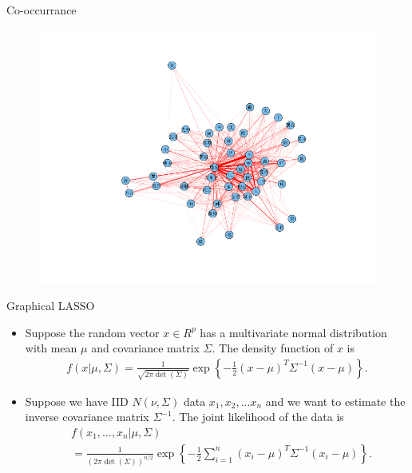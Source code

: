 \documentclass[12pt, trans]{beamer}
\newcommand{\1}[1]{{\mathbf 1}\left\{#1\right\}}        %
\def\lp{\left(}
\def\rp{\right)}
\begin{document}
\begin{frame}{Co-occurrance}

\begin{figure}
  \centering
  \includegraphics[height=0.9\textheight]{./../../coocurResults/cooccurNetwork.png} 
\end{figure}

\end{frame}

\begin{frame}[fragile]{Graphical LASSO}

\begin{itemize}[<+->]
\item Suppose the random vector $x\in R^p$ has a multivariate normal distribution with mean $\mu$ and covariance matrix $\Sigma$. The density function of $x$ is
\begin{align*}
\label{eq: normalPDF}
f(x|\mu,\Sigma) = \frac{1}{\sqrt{2\pi \det\lp \Sigma\rp}}\exp \left\{ -\frac{1}{2} (x-\mu)^T \Sigma^{-1}(x-\mu) \right\}.
\end{align*}

\item Suppose we have IID $N(\nu,\Sigma)$ data $x_1,x_2,...x_n$ and we want to estimate the inverse covariance matrix $\Sigma^{-1}$. The joint likelihood of the data is
\begin{align*}
& f(x_1, \dots, x_n|\mu,\Sigma) 
\\&= \frac{1}{(2\pi \det\lp \Sigma\rp)^{n/2}}\exp\left\{ -\frac{1}{2} \sum_{i=1}^n(x_i-\mu)^T\Sigma^{-1}(x_i-\mu) \right\}.
\end{align*}

\end{itemize}

\end{frame}
\end{document}
